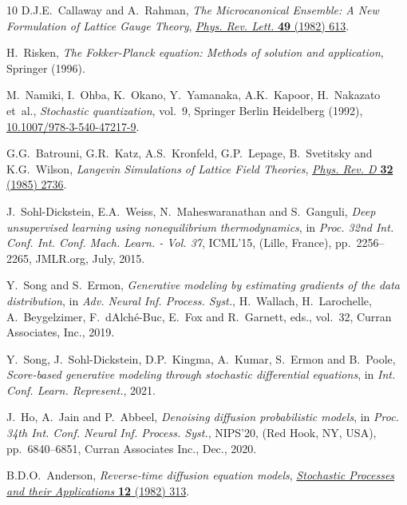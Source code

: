 \begin{thebibliography}{10}
D.J.E.~Callaway and A.~Rahman, \emph{{The Microcanonical Ensemble: A New
  Formulation of Lattice Gauge Theory}},
  \href{https://doi.org/10.1103/PhysRevLett.49.613}{\emph{Phys. Rev. Lett.}
  {\bfseries 49} (1982) 613}.

H.~Risken, \emph{The Fokker-Planck equation: Methods of solution and
  application}, Springer (1996).

M.~Namiki, I.~Ohba, K.~Okano, Y.~Yamanaka, A.K.~Kapoor, H.~Nakazato et~al.,
  \emph{{Stochastic quantization}}, vol.~9, Springer Berlin Heidelberg (1992),
  \href{https://doi.org/10.1007/978-3-540-47217-9}{10.1007/978-3-540-47217-9}.

G.G.~Batrouni, G.R.~Katz, A.S.~Kronfeld, G.P.~Lepage, B.~Svetitsky and
  K.G.~Wilson, \emph{{Langevin Simulations of Lattice Field Theories}},
  \href{https://doi.org/10.1103/PhysRevD.32.2736}{\emph{Phys. Rev. D}
  {\bfseries 32} (1985) 2736}.

J.~{Sohl-Dickstein}, E.A.~Weiss, N.~Maheswaranathan and S.~Ganguli, \emph{Deep
  unsupervised learning using nonequilibrium thermodynamics},  in \emph{Proc.
  32nd {{Int}}. {{Conf}}. {{Int}}. {{Conf}}. {{Mach}}. {{Learn}}. - {{Vol}}.
  37}, {{ICML}}'15, ({Lille, France}), pp.~2256--2265, {JMLR.org}, July, 2015.

Y.~Song and S.~Ermon, \emph{Generative modeling by estimating gradients of the
  data distribution},  in \emph{Adv. {{Neural Inf}}. {{Process}}. {{Syst}}.},
  H.~Wallach, H.~Larochelle, A.~Beygelzimer, F.~{dAlch{\'e}-Buc}, E.~Fox and
  R.~Garnett, eds., vol.~32, {Curran Associates, Inc.}, 2019.

Y.~Song, J.~{Sohl-Dickstein}, D.P.~Kingma, A.~Kumar, S.~Ermon and B.~Poole,
  \emph{Score-based generative modeling through stochastic differential
  equations},  in \emph{Int. {{Conf}}. {{Learn}}. {{Represent}}.}, 2021.

J.~Ho, A.~Jain and P.~Abbeel, \emph{Denoising diffusion probabilistic models},
  in \emph{Proc. 34th {{Int}}. {{Conf}}. {{Neural Inf}}. {{Process}}.
  {{Syst}}.}, {{NIPS}}'20, ({Red Hook, NY, USA}), pp.~6840--6851, {Curran
  Associates Inc.}, Dec., 2020.

B.D.O.~Anderson, \emph{Reverse-time diffusion equation models},
  \href{https://doi.org/10.1016/0304-4149(82)90051-5}{\emph{Stochastic
  Processes and their Applications} {\bfseries 12} (1982) 313}.


\end{thebibliography}
